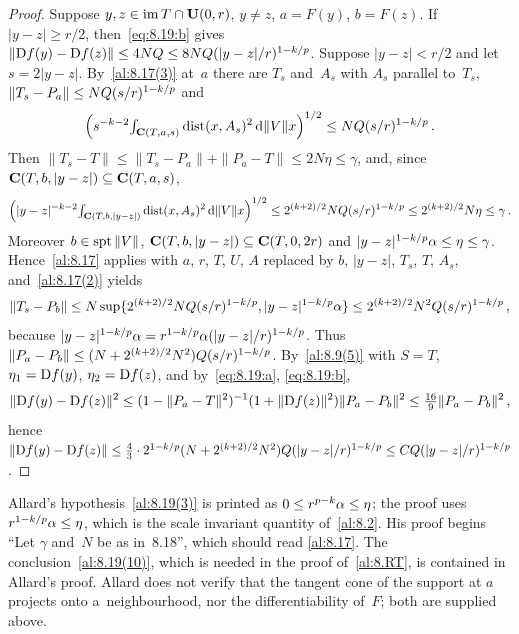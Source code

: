 \begin{proof}
    Suppose $y, z \in \operatorname{im} T \cap \mathbf{U}(0,r)$, $y \ne z$, $a = F(y)$, $b = F(z)$. If $|y - z| \ge
    r/2$, then~\eqref{eq:8.19:b} gives $\|\mathrm{D} f(y) - \mathrm{D} f(z)\| \le 4 N Q \le 8 N Q (|y - z|/r)^{1 -
    k/p}$. Suppose $|y - z| < r/2$ and let $s = 2 |y - z|$. By~\ref{al:8.17(3)} at~$a$ there are
    $T_s$ and~$A_s$ with $A_s$ parallel to~$T_s$, $\|T_s - P_a\| \le N Q (s/r)^{1 - k/p}$ and
    \begin{displaymath}
        \Big( s^{-k-2} {\textstyle\int_{\mathbf{C} ( T, a, s )}^{}} \operatorname{dist}(x, A_s)^2 \,\mathrm{d} \|V\| x \Big)^{1/2} \le N
        Q (s/r)^{1 - k/p} \,.
    \end{displaymath}
    Then $\|T_s - T\| \le \|T_s - P_a\| + \|P_a - T\| \le 2 N \eta \le \gamma$, and, since
    $\mathbf{C} ( T, b, |y - z| ) \subseteq \mathbf{C} ( T, a, s )$,
    \begin{displaymath}
        \Big( |y - z|^{-k-2} {\textstyle\int_{\mathbf{C} ( T, b, |y - z| )}^{}} \operatorname{dist}(x, A_s)^2 \,\mathrm{d} \|V\| x
        \Big)^{1/2} \le 2^{(k+2)/2} N Q (s/r)^{1 - k/p} \le 2^{(k+2)/2} N \eta \le
        \gamma \,.
    \end{displaymath}
    Moreover $b \in \operatorname{spt} \|V\|$, $\mathbf{C} ( T, b, |y - z| ) \subseteq \mathbf{C} ( T, 0, 2r )$ and $|y -
    z|^{1 - k/p} \alpha \le \eta \le \gamma$. Hence~\ref{al:8.17} applies with $a$, $r$, $T$,
    $U$, $A$ replaced by $b$, $|y - z|$, $T_s$, $T$, $A_s$, and~\ref{al:8.17(2)} yields
    \begin{displaymath}
        \|T_s - P_b\| \le N \sup \{ 2^{(k+2)/2} N Q (s/r)^{1 - k/p}, |y - z|^{1 - k/p}
        \alpha \} \le 2^{(k+2)/2} N^2 Q (s/r)^{1 - k/p} \,,
    \end{displaymath}
    because $|y - z|^{1-k/p} \alpha = r^{1 - k/p} \alpha (|y-z|/r)^{1 - k/p}$. Thus
    $\|P_a - P_b\| \le (N + 2^{(k+2)/2} N^2) Q (s/r)^{1 - k/p}$. By~\ref{al:8.9(5)} with $S
    = T$, $\eta_1 = \mathrm{D} f(y)$, $\eta_2 = \mathrm{D} f(z)$, and by~\eqref{eq:8.19:a}, \eqref{eq:8.19:b},
    \begin{displaymath}
        \|\mathrm{D} f(y) - \mathrm{D} f(z)\|^2 \le (1 - \|P_a - T\|^2)^{-1} (1 + \|\mathrm{D} f(z)\|^2) \|P_a - P_b\|^2
        \le \tfrac{16}{9} \|P_a - P_b\|^2 \,,
    \end{displaymath}
    hence $\|\mathrm{D} f(y) - \mathrm{D} f(z)\| \le \frac43 \cdot 2^{1 - k/p} (N + 2^{(k+2)/2} N^2) Q
    (|y - z|/r)^{1 - k/p} \le C Q (|y - z|/r)^{1 - k/p}$.
\end{proof}

\begin{remark}
    \label{rem:8.19}
    Allard's hypothesis~\ref{al:8.19(3)} is printed as $0 \le r^{p - k} \alpha \le \eta$; the
    proof uses $r^{1 - k/p} \alpha \le \eta$, which is the scale invariant quantity
    of~\ref{al:8.2}. His proof begins ``Let $\gamma$ and~$N$ be as in~8.18'', which should read
    \ref{al:8.17}. The conclusion~\ref{al:8.19(10)}, which is needed in the proof of~\ref{al:8.RT},
    is contained in Allard's proof. Allard does not verify that the tangent cone of the support at
    $a$ projects onto a~neighbourhood, nor the differentiability of~$F$; both are supplied above.
\end{remark}

